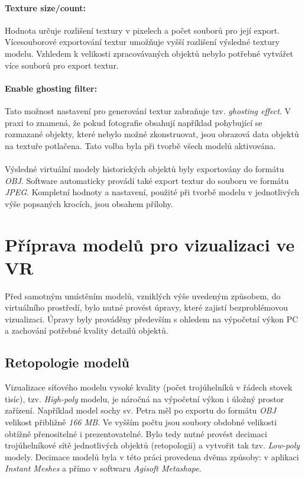 \documentclass[a4paper, 12pt]{report}
\begin{document}
\subsubsection*{Texture size/count:}
Hodnota určuje rozlišení textury v pixelech a počet souborů pro její export. Vícesouborové exportování textur umožňuje vyšší rozlišení výsledné textury modelu. Vzhledem k velikosti zpracovávaných objektů nebylo potřebné vytvářet více souborů pro export textur. 

\subsubsection*{Enable ghosting filter:}
Tato možnost nastavení pro generování textur zabraňuje tzv. \textit{ghosting effect}. V praxi to znamená, že pokud fotografie obsahují například pohybující se rozmazané objekty, které nebylo možné zkonstruovat, jsou obrazová data objektů na textuře potlačena. Tato volba byla při tvorbě všech modelů aktivována.\\
\\
Výsledné virtuální modely historických objektů byly exportovány do formátu \textit{OBJ}. Software automaticky provádí také export textur do souboru ve formátu \textit{JPEG}. Kompletní hodnoty a nastavení, použité při tvorbě modelu v jednotlivých výše popsaných krocích, jsou obsahem přílohy.

\chapter{Příprava modelů pro vizualizaci ve VR}
Před samotným umístěním modelů, vzniklých výše uvedeným způsobem, do virtuálního prostředí, bylo nutné provést úpravy, které zajistí bezproblémovou vizualizaci. Úpravy byly prováděny především s ohledem na výpočetní výkon PC a zachování potřebné kvality detailů objektů. 

\section{Retopologie modelů}
Vizualizace síťového modelu vysoké kvality (počet trojúhelníků v řádech stovek tisíc), tzv. \textit{High-poly} modelu, je náročná na výpočetní výkon i úložný prostor zařízení. Například model sochy sv. Petra měl po exportu do formátu \textit{OBJ} velikost přibližně \textit{166 MB}. Ve vyšším počtu jsou soubory obdobné velikosti obtížně přenositelné i prezentovatelné. Bylo tedy nutné provést decimaci trojúhelníkové sítě jednotlivých objektů (retopologii) a vytvořit tak tzv. \textit{Low-poly} modely. Decimace modelů byla v této práci provedena dvěma způsoby: v aplikaci \textit{Instant Meshes} a přímo v softwaru \textit{Agisoft Metashape}.
\end{document}
